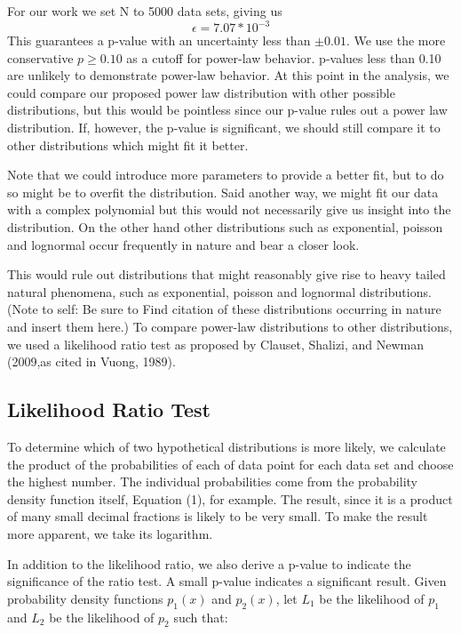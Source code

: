 \documentclass[12pt]{article}
\begin{document}
For our work we set N to 5000 data sets, giving us $$\epsilon  = 7.07*10^{-3}$$ This guarantees a p-value with an uncertainty less than  $\pm0.01$. We use the more conservative $p \geq 0.10$ as a cutoff for power-law behavior. p-values less than 0.10 are unlikely to demonstrate power-law behavior. At this point in the analysis, we could compare our proposed power law distribution with other possible distributions, but this would be pointless since our p-value rules out a power law distribution.  If, however, the p-value is significant, we should still compare it to other distributions which might fit it better. 

Note that we could introduce more parameters to provide a better fit, but to do so might be to overfit the distribution.  Said another way, we might fit our data with a complex polynomial but this would not necessarily give us insight into the distribution.  On the other hand other distributions such as exponential, poisson and lognormal occur frequently in nature and bear a closer look.

This would rule out distributions that might reasonably give rise to heavy tailed natural phenomena, such as exponential, poisson and lognormal distributions. (Note to self: Be sure to Find citation of these distributions occurring in nature and insert them here.) To compare power-law distributions to other distributions, we used a likelihood ratio test as proposed by Clauset, Shalizi, and Newman (2009,as cited in Vuong, 1989).

\subsection{Likelihood Ratio Test}

To determine which of two hypothetical distributions is more likely,  we  calculate the product of the probabilities of each of data point for each data set and choose the highest number.  The individual probabilities come from the probability density function itself, Equation (1), for example.  The result, since it is a product of many small decimal fractions is likely to be very small. To make the result more apparent, we take its logarithm. 

In addition to the likelihood ratio, we also derive a p-value to indicate the significance of the ratio test.  A small p-value indicates a significant result.
Given probability density functions $p_{1}(x)$ and $p_{2}(x)$,  let $L_1$ be the likelihood of $p_1$ and $L_2$ be the likelihood of $p_2$ such that:
\end{document}

